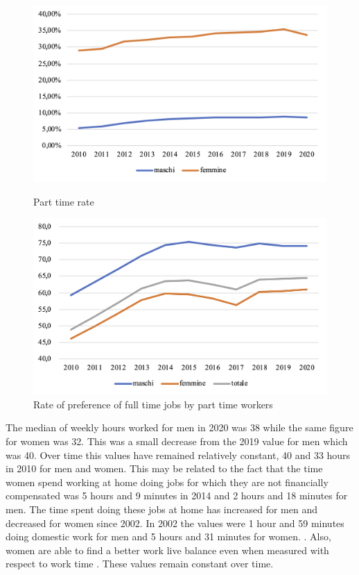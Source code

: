 \documentclass[12pt]{article}
\begin{document}
\begin{spacing}{1.5}
\begin{figure}
	\begin{minipage}[b]{0.5\textwidth}
		\begin{center}
			\includegraphics[width=\textwidth]{./images/part-time-rate-gender.png}
		\end{center}
			\caption{Part time rate}
	\end{minipage}
	\begin{minipage}[b]{0.5\textwidth}
		\begin{center}
			\includegraphics[width=\textwidth]{./images/prefer-part-time-gender.png}
		\end{center}
			\caption{Rate of preference of full time jobs by part time workers}
	\end{minipage}
\end{figure}

The median of weekly hours worked for men in 2020 was 38 while the same figure for women was 32. This was a small decrease from the 2019 value for men which was 40. Over time this values have remained relatively constant, 40 and 33 hours in 2010 for men and women. This may be related to the fact that the time women spend working at home doing jobs for which they are not financially compensated was 5 hours and 9 minutes in 2014 and 2 hours and 18 minutes for men. The time spent doing these jobs at home has increased for men and decreased for women since 2002. In 2002 the values were 1 hour and 59 minutes doing domestic work for men and 5 hours and 31 minutes for women. \cite{cappadozzi2019tempi}. Also, women are able to find a better work live balance even when measured with respect to work time \cite{canal2018punto}. These values remain constant over time.


\end{spacing}
\end{document}
